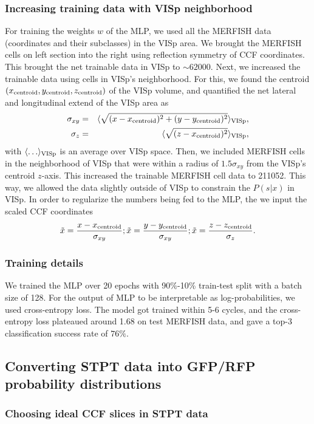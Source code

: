 \documentclass{article}
\newcommand\beq{\begin{equation}}
\newcommand\eeq[1]{\label{#1}\end{equation}}
\newcommand\beqa{\begin{eqnarray}}
\newcommand\eeqa[1]{\label{#1}\end{eqnarray}}
\begin{document}
\subsubsection{Increasing training data with VISp neighborhood}

For training the weights $w$ of the MLP, we used all the MERFISH
data (coordinates and their subclasses) in the VISp area.  We brought
the MERFISH cells on left section into the right using reflection
symmetry of CCF coordinates. This brought the net trainable data
in VISp to $\sim 62000$.  Next, we increased the trainable data
using cells in VISp's neighborhood. For this, we found the centroid
$(x_{\rm centroid}, y_{\rm centroid}, z_{\rm centroid})$ of the
VISp volume, and quantified the net lateral and longitudinal extend
of the VISp area as
\beqa
\sigma_{xy} &=& \langle \sqrt{(x-x_{\rm centroid})^2 + (y-y_{\rm centroid})^2}\rangle_{\rm VISp},\cr
\sigma_{z} &=& \langle \sqrt{(z-x_{\rm centroid})^2}\rangle_{\rm VISp},
\eeqa{vispsize}
with $\langle \ldots\rangle_{\rm VISp}$ is an average over VISp
space. Then, we included MERFISH cells in the neighborhood of VISp
that were within a radius of $1.5 \sigma_{xy}$ from the VISp's
centroid $z$-axis. This increased the trainable MERFISH cell data
to 211052. This way, we allowed the data slightly outside of VISp
to constrain the $P(s|x)$ in VISp. In order to regularize the numbers
being fed to the MLP, the we input the scaled CCF coordinates
\beq
\tilde{x} = \frac{x-x_{\rm centroid}}{\sigma_{xy}}; \tilde{x} = \frac{y-y_{\rm centroid}}{\sigma_{xy}}; \tilde{x} = \frac{z-z_{\rm centroid}}{\sigma_{z}}.
\eeq{scalepos}

\subsubsection{Training details }

We trained the MLP over 20 epochs with 90\%-10\% train-test split
with a batch size of 128. For the output of MLP to be interpretable
as log-probabilities, we used cross-entropy loss. The model got
trained within 5-6 cycles, and the cross-entropy loss plateaued
around 1.68 on test MERFISH data, and gave a top-3 classification
success rate of $76\%$.

\subsection{Converting STPT data into GFP/RFP probability distributions} 

\subsubsection{Choosing ideal CCF slices in STPT data}
\end{document}
